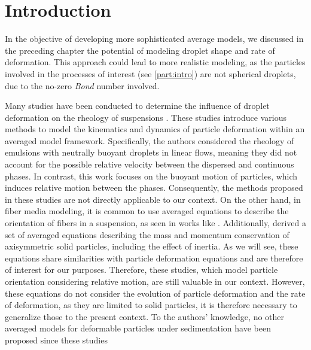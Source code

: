 \section{Introduction}
\label{sec:intro_ellipse}
In the objective of developing more sophisticated average models, we discussed in the preceding chapter the potential of modeling droplet shape and rate of deformation. 
This approach could lead to more realistic modeling, as the particles involved in the processes of interest (see \ref{part:intro}) are not spherical droplets, due to the no-zero \textit{Bond} number involved.

Many studies have been conducted to determine the influence of droplet deformation on the rheology of suspensions \citep{goddard1967nonlinear,lhuillier1987phenomenology,maffettone1998equation,raja2010inertial,mwasame2017macroscopic}.
These studies introduce various methods to model the kinematics and dynamics of particle deformation within an averaged model framework. 
Specifically, the authors considered the rheology of emulsions with neutrally buoyant droplets in linear flows, meaning they did not account for the possible relative velocity between the dispersed and continuous phases. 
In contrast, this work focuses on the buoyant motion of particles, which induces relative motion between the phases. 
Consequently, the methods proposed in these studies are not directly applicable to our context. 
On the other hand, in fiber media modeling, it is common to use averaged equations to describe the orientation of fibers in a suspension, as seen in works like \citep{wang2008objective}. 
Additionally, \citet{curtiss1956kinetic} derived a set of averaged equations describing the mass and momentum conservation of axisymmetric solid particles, including the effect of inertia. 
As we will see, these equations share similarities with particle deformation equations and are therefore of interest for our purposes.
Therefore, these studies, which model particle orientation considering relative motion, are still valuable in our context. 
However, these equations do not consider the evolution of particle deformation and the rate of deformation, as they are limited to solid particles, it is therefore necessary to generalize those to the present context.  
To the authors' knowledge, no other averaged models for deformable particles under sedimentation have been proposed since these studies

